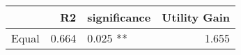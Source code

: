 \begin{tabular}{lrlr}
\toprule
{} &    R2 & significance &  Utility Gain \\
\midrule
Equal & 0.664 &     0.025 ** &         1.655 \\
\bottomrule
\end{tabular}
